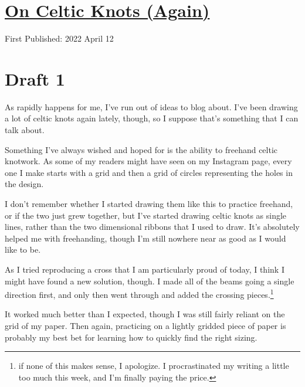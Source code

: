 \documentclass[12pt]{article}[titlepage]
\renewcommand{\,}{\textsuperscript{,}}
\begin{document}
\doublespacing
\section{\href{celtic-knots-2.html}{On Celtic Knots (Again)}}
First Published: 2022 April 12

\section{Draft 1}
As rapidly happens for me, I've run out of ideas to blog about.
I've been drawing a lot of celtic knots again lately, though, so I suppose that's something that I can talk about.

Something I've always wished and hoped for is the ability to freehand celtic knotwork.
As some of my readers might have seen on my Instagram page, every one I make starts with a grid and then a grid of circles representing the holes in the design.

I don't remember whether I started drawing them like this to practice freehand, or if the two just grew together, but I've started drawing celtic knots as single lines, rather than the two dimensional ribbons that I used to draw.
It's absolutely helped me with freehanding, though I'm still nowhere near as good as I would like to be.

As I tried reproducing a cross that I am particularly proud of today, I think I might have found a new solution, though.
I made all of the beams going a single direction first, and only then went through and added the crossing pieces.\footnote{if none of this makes sense, I apologize.
I procrastinated my writing a little too much this week, and I'm finally paying the price.}

It worked much better than I expected, though I was still fairly reliant on the grid of my paper.
Then again, practicing on a lightly gridded piece of paper is probably my best bet for learning how to quickly find the right sizing.
\end{document}
